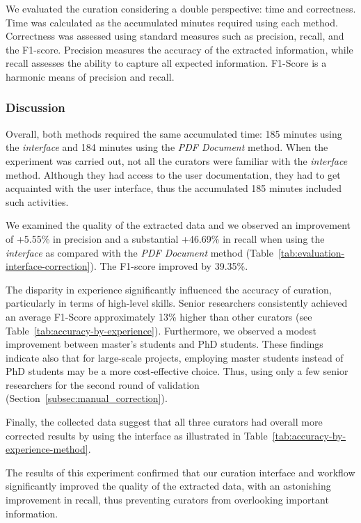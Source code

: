 \documentclass[]{interact}
\theoremstyle{plain} %
\theoremstyle{definition}
\theoremstyle{remark}
\begin{document}
We evaluated the curation considering a double perspective: time and correctness. 
Time was calculated as the accumulated minutes required using each method. 
Correctness was assessed using standard measures such as precision, recall, and the F1-score.
Precision measures the accuracy of the extracted information, while recall assesses the ability to capture all expected information. F1-Score is a harmonic means of precision and recall. 

\subsubsection{Discussion}
Overall, both methods required the same accumulated time: 185 minutes using the \textit{interface} and 184 minutes using the \textit{PDF Document} method.
When the experiment was carried out, not all the curators were familiar with the \textit{interface} method. Although they had access to the user documentation, they had to get acquainted with the user interface, thus the accumulated 185 minutes included such activities. 

We examined the quality of the extracted data and we observed an improvement of +5.55\% in precision and a substantial +46.69\% in recall when using the \textit{interface} as compared with the \textit{PDF Document} method (Table~\ref{tab:evaluation-interface-correction}). 
The F1-score improved by 39.35\%.

The disparity in experience significantly influenced the accuracy of curation, particularly in terms of high-level skills. Senior researchers consistently achieved an average F1-Score approximately 13\% higher than other curators (see Table~\ref{tab:accuracy-by-experience}). Furthermore, we observed a modest improvement between master's students and PhD students. These findings indicate also that for large-scale projects, employing master students instead of PhD students may be a more cost-effective choice. Thus, using only a few senior researchers for the second round of validation (Section~\ref{subsec:manual_correction}).

Finally, the collected data suggest that all three curators had overall more corrected results by using the interface as illustrated in Table~\ref{tab:accuracy-by-experience-method}. 

The results of this experiment confirmed that our curation interface and workflow significantly improved the quality of the extracted data, with an astonishing improvement in recall, thus preventing curators from overlooking important information.
\end{document}
